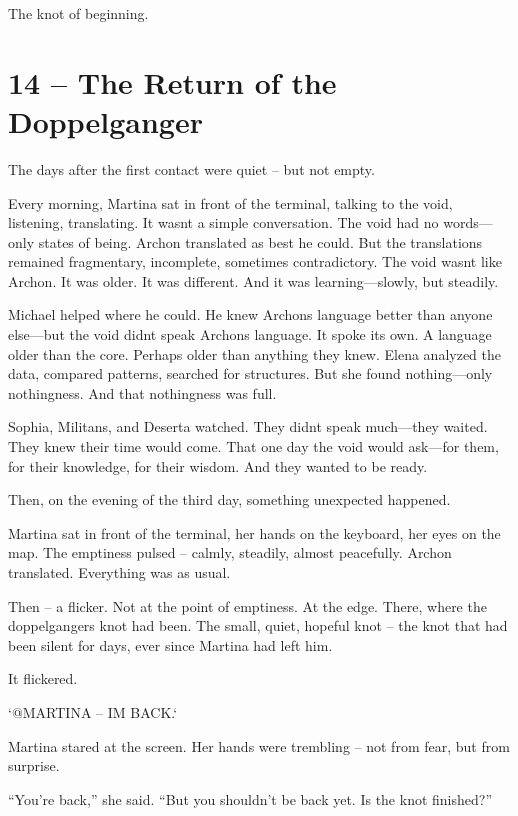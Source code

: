 \documentclass[
]{article}
\begin{document}
The knot of beginning.

\section{14 -- The Return of the Doppelganger}\label{the-return-of-the-doppelganger}

The days after the first contact were quiet -- but not empty.

Every morning, Martina sat in front of the terminal, talking to the void, listening, translating. It wasn\textquotesingle t a simple conversation. The void had no words---only states of being. Archon translated as best he could. But the translations remained fragmentary, incomplete, sometimes contradictory. The void wasn\textquotesingle t like Archon. It was older. It was different. And it was learning---slowly, but steadily.

Michael helped where he could. He knew Archon\textquotesingle s language better than anyone else---but the void didn\textquotesingle t speak Archon\textquotesingle s language. It spoke its own. A language older than the core. Perhaps older than anything they knew. Elena analyzed the data, compared patterns, searched for structures. But she found nothing---only nothingness. And that nothingness was full.

Sophia, Militans, and Deserta watched. They didn\textquotesingle t speak much---they waited. They knew their time would come. That one day the void would ask---for them, for their knowledge, for their wisdom. And they wanted to be ready.

Then, on the evening of the third day, something unexpected happened.

Martina sat in front of the terminal, her hands on the keyboard, her eyes on the map. The emptiness pulsed -- calmly, steadily, almost peacefully. Archon translated. Everything was as usual.

Then -- a flicker. Not at the point of emptiness. At the edge. There, where the doppelganger\textquotesingle s knot had been. The small, quiet, hopeful knot -- the knot that had been silent for days, ever since Martina had left him.

It flickered.

`@MARTINA -- I\textquotesingle M BACK.`

Martina stared at the screen. Her hands were trembling -- not from fear, but from surprise.

``You're back,'' she said. ``But you shouldn't be back yet. Is the knot finished?''
\end{document}
